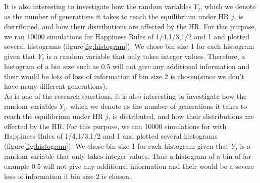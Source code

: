 It is also interesting to investigate how the random variables $Y_j$, which we denote as the number of generations it takes to reach the equilibrium under HR $j$, is distributed, and how their distributions are affected by the HR. 
For this purpose, we ran 10000 simulations for Happiness Rules of 1/4,1/3,1/2 and 1 and plotted several histograms (figure\ref{fig:histogram}). 
We chose bin size 1 for each histogram given that $Y_j$ is a random variable that only takes integer values. 
Therefore, a histogram of a bin size such as 0.5 will not give any additional information and their would be lots of loss of information if bin size 2 is chosen(since we don't have many different generations). \\

As is one of the research questions, it is also interesting to investigate how the random variables $Y_j$, which we denote as the number of generations it takes to reach the equilibrium under HR $j$, is distributed, and how their distributions are effected by the HR. 
For this purpose, we ran 10000 simulations for with Happiness Rules of 1/4,1/3,1/2 and 1 and plotted several histograms (figure\ref{fig:histogram}). 
We chose bin size 1 for each histogram given that $Y_j$ is a random variable that only takes integer values. 
Thus a histogram of a bin of for example $0.5$ will not give any additional information and their would be a severe loss of information if bin size $2$ is chosen. 

